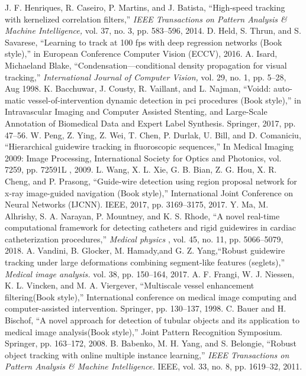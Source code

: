 \documentclass[letterpaper, 10 pt, conference]{ieeeconf}  %
\begin{document}
\begin{thebibliography}{99}

 J. F. Henriques, R. Caseiro, P. Martins, and J. Batista, “High-speed tracking with kernelized correlation filters,” \emph{IEEE Transactions on Pattern Analysis & Machine Intelligence,} vol. 37, no. 3, pp. 583–596, 2014.
 D. Held, S. Thrun, and S. Savarese, “Learning to track at 100 fps with deep regression networks (Book style),” in European Conference Computer Vision (ECCV), 2016.
 A. Isard, Michaeland Blake, “Condensation—conditional density propagation for visual tracking,” \emph{International Journal of Computer Vision,} vol. 29, no. 1, pp. 5–28, Aug 1998. 
 K. Bacchuwar, J. Cousty, R. Vaillant, and L. Najman, “Voidd: auto- matic vessel-of-intervention dynamic detection in pci procedures (Book style),” in Intravascular Imaging and Computer Assisted Stenting, and Large-Scale Annotation of Biomedical Data and Expert Label Synthesis. Springer, 2017, pp. 47–56.
 W. Peng, Z. Ying, Z. Wei, T. Chen, P. Durlak, U. Bill, and D. Comaniciu, “Hierarchical guidewire tracking in fluoroscopic sequences,” In Medical Imaging 2009: Image Processing, International Society for Optics and Photonics, vol. 7259, pp. 72591L , 2009.
 L. Wang, X. L. Xie, G. B. Bian, Z. G. Hou, X. R. Cheng, and P. Prasong, “Guide-wire detection using region proposal network for x-ray image-guided navigation (Book style),” International Joint Conference on Neural Networks (IJCNN). IEEE, 2017, pp. 3169–3175, 2017.
 Y. Ma, M. Alhrishy, S. A. Narayan, P. Mountney, and K. S. Rhode, “A novel real-time computational framework for detecting catheters and rigid guidewires in cardiac catheterization procedures,” \emph{ Medical physics }, vol. 45, no. 11, pp. 5066–5079, 2018.
 A. Vandini, B. Glocker, M. Hamady,and G. Z. Yang,“Robust guidewire tracking under large deformations combining segment-like features (seglets),” \emph{Medical image analysis. } vol. 38, pp. 150–164, 2017.
 A. F. Frangi, W. J. Niessen, K. L. Vincken, and M. A. Viergever, “Multiscale vessel enhancement filtering(Book style),” International conference on medical image computing and computer-assisted intervention. Springer,  pp. 130–137, 1998.
 C. Bauer and H. Bischof, “A novel approach for detection of tubular objects and its application to medical image analysis(Book style),”  Joint Pattern Recognition Symposium. Springer,  pp. 163–172, 2008.
 B. Babenko, M. H. Yang, and S. Belongie, “Robust object tracking with online multiple instance learning,”  \emph{ IEEE Transactions on Pattern Analysis & Machine Intelligence. } IEEE, vol. 33, no. 8, pp. 1619–32, 2011.

\end{thebibliography}
\end{document}
